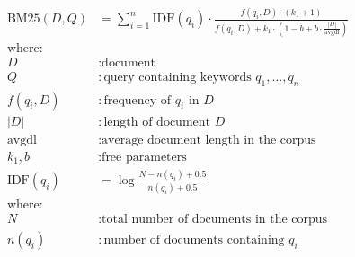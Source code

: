 \begin{align*}
    \text{BM25}(D,Q) &= \sum_{i=1}^n \text{IDF}(q_i) \cdot \frac{f(q_i, D) \cdot (k_1 + 1)}{f(q_i, D) + k_1 \cdot (1 - b + b \cdot \frac{|D|}{\text{avgdl}})} \\[2ex]
    \text{where:} \\
    D &: \text{document} \\
    Q &: \text{query containing keywords } q_1, ..., q_n \\
    f(q_i, D) &: \text{frequency of } q_i \text{ in } D \\
    |D| &: \text{length of document } D \\
    \text{avgdl} &: \text{average document length in the corpus} \\
    k_1, b &: \text{free parameters} \\[2ex]
    \text{IDF}(q_i) &= \log \frac{N - n(q_i) + 0.5}{n(q_i) + 0.5} \\[2ex]
    \text{where:} \\
    N &: \text{total number of documents in the corpus} \\
    n(q_i) &: \text{number of documents containing } q_i
\end{align*}
%
%
%
%
%
%

